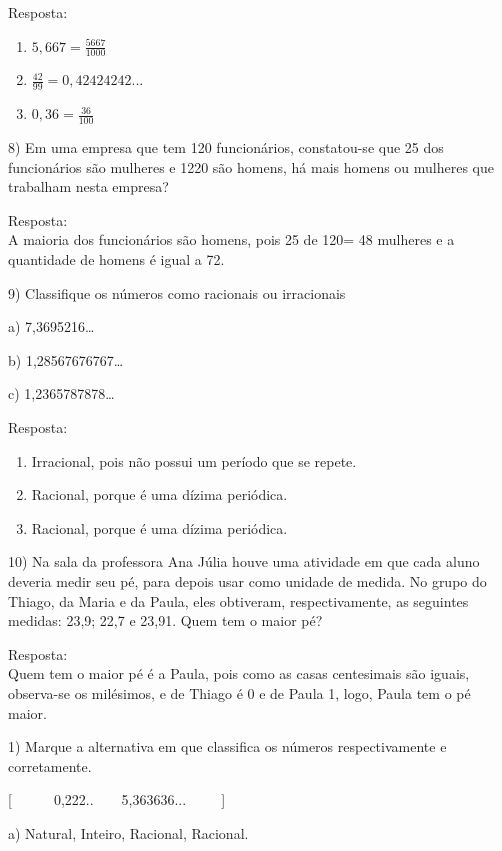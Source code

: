 Resposta:~~~~~~~~

\begin{enumerate}
\def\labelenumi{\alph{enumi})}
\item
  \(5,667 = \frac{5667}{1000}\)
\item
  \(\frac{42}{99} = 0,42424242...\)
\item
  \(0,36 = \frac{36}{100}\)
\end{enumerate}

8) Em uma empresa que tem 120 funcionários, constatou-se que 25 dos
funcionários são mulheres e 1220 são homens, há mais homens ou mulheres
que trabalham nesta empresa?~

Resposta:\\
A maioria dos funcionários são homens, pois 25 de 120= 48 mulheres e a
quantidade de homens é igual a 72.

9) Classifique os números como racionais ou irracionais

a) 7,3695216\ldots{}

b) 1,28567676767\ldots{}

c) 1,2365787878\ldots{}

Resposta:

\begin{enumerate}
\def\labelenumi{\alph{enumi})}
\item
  Irracional, pois não possui um período que se repete.
\item
  Racional, porque é uma dízima periódica.
\item
  Racional, porque é uma dízima periódica.
\end{enumerate}

10) Na sala da professora Ana Júlia houve uma atividade em que cada
aluno deveria medir seu pé, para depois usar como unidade de medida. No
grupo do Thiago, da Maria e da Paula, eles obtiveram, respectivamente,
as seguintes medidas: 23,9; 22,7 e 23,91. Quem tem o maior pé?

Resposta:\\
Quem tem o maior pé é a Paula, pois como as casas centesimais são
iguais, observa-se os milésimos, e de Thiago é 0 e de Paula 1, logo,
Paula tem o pé maior.


1) Marque a alternativa em que classifica os números respectivamente e
corretamente.

[\ \ \ \ \ \ 0,222..\ \ \ \ 5,363636...\ \ \ \ \ ]

a) Natural, Inteiro, Racional, Racional.


